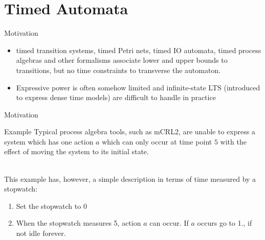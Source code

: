 \documentclass{beamer}
\def\dgold#1{{\darkgoldenrod #1}}
\def\dkb#1{{\blue #1}}
\begin{document}

\section{Timed Automata}
\begin{slide}{Motivation}
\small

\begin{itemize}
\item \dgold{timed transition systems}, \dgold{timed Petri nets}, \dgold{timed IO automata}, \dgold{timed process algebras} and other formalisms associate lower and upper bounds to transitions, but no \dkb{time constraints} to transverse the automaton.
\item Expressive power is often somehow limited and \dgold{infinite}-state LTS (introduced to express \dkb{dense} time models) are 
difficult to handle in practice
\end{itemize}
\end{slide}


\begin{slide}{Motivation}
\small

\begin{block}{Example}
Typical process algebra tools, such as mCRL2, are unable to express a \dgold{system which has one action $a$ which can only occur at time point $5$
with the effect of moving the system to its initial state.}
\end{block}
~\\

This example has, however, a simple description in terms of time measured by a \dgold{stopwatch}:
\begin{enumerate}
\item Set the stopwatch to 0
\item When the stopwatch measures 5, action $a$ can occur. If $a$ occurs go to 1., if not idle forever.
\end{enumerate}

~\\
\end{slide}
\end{document}
